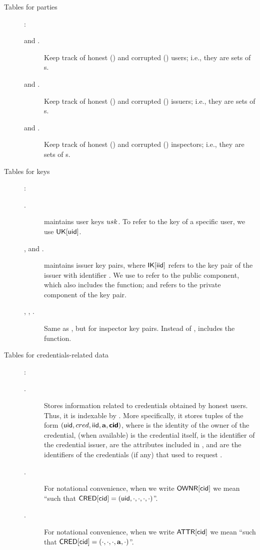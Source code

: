 \begin{description}
\item[Tables for parties]:
  \begin{description}
  \item[\HU and \CU.] Keep track of honest (\HU) and corrupted (\CU) users;
    i.e., they are sets of {\uid}s.
  \item[\HI and \CI.] Keep track of honest (\HI) and corrupted (\CI) issuers;
    i.e., they are sets of {\iid}s.
  \item[\HO and \CO.] Keep track of honest (\HO) and corrupted (\CO) inspectors;
    i.e., they are sets of {\oid}s.
  \end{description}
\item[Tables for keys]:
  \begin{description}
  \item[\UK.] \UK maintains user keys $usk$. To refer to the key of a specific
    user, we use $\mathsf{UK}[\mathsf{uid}]$. 
  \item[\IK, \PUBIK and \PRVIK.] \IK maintains issuer key pairs, where
    $\mathsf{IK}[\mathsf{iid}]$ refers to the key pair of the issuer with identifier \iid. We
    use \PUBIK to refer to the public component, which also includes the \fissue
    function; and \PRVIK refers to the private component of the key pair.
  \item[\OK, \PUBOK, \PRVOK.] Same as \IK, but for inspector key pairs. Instead
    of \fissue, \OK includes the \finsp function.
  \end{description}
\item[Tables for credentials-related data]:
  \begin{description}
  \item[\CRED.] Stores information related to credentials obtained by honest
    users. Thus, it is indexable by \cid. More specifically, it stores tuples of
    the form $(\mathsf{uid},cred,\mathsf{iid},\mathbf{a},\boldsymbol{\mathsf{cid}})$, where \uid is the identity of the
    owner of the credential, \cred (when available) is the credential itself,
    \iid is the identifier of the credential issuer, \attrs are the attributes
    included in \cred, and \scid are the identifiers of the credentials (if any)
    that \uid used to request \cred.
  \item[\OWNR.] For notational convenience, when we write $\mathsf{OWNR}[\mathsf{cid}]$ we mean
    ``\uid such that $\mathsf{CRED}[\mathsf{cid}] = (\mathsf{uid}, \cdot, \cdot, \cdot, \cdot)$''.
  \item[\ATTR.] For notational convenience, when we write $\mathsf{ATTR}[\mathsf{cid}]$ we mean
    ``\attrs such that $\mathsf{CRED}[\mathsf{cid}] = (\cdot, \cdot, \cdot, \mathbf{a}, \cdot)$''.

\end{description}
\end{description}

